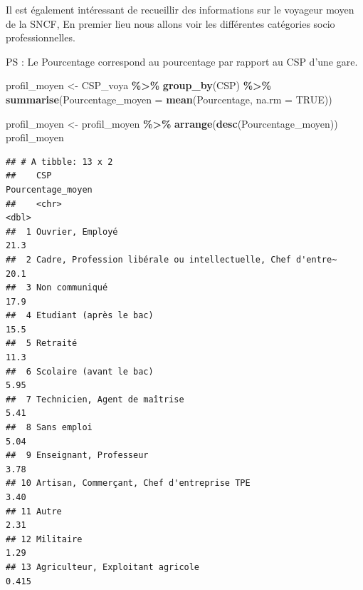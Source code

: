 \documentclass[
]{article}
\newenvironment{Shaded}{\begin{snugshade}}{\end{snugshade}}
\newcommand{\AttributeTok}[1]{\textcolor[rgb]{0.13,0.29,0.53}{#1}}
\newcommand{\ConstantTok}[1]{\textcolor[rgb]{0.56,0.35,0.01}{#1}}
\newcommand{\FunctionTok}[1]{\textcolor[rgb]{0.13,0.29,0.53}{\textbf{#1}}}
\newcommand{\NormalTok}[1]{#1}
\newcommand{\OtherTok}[1]{\textcolor[rgb]{0.56,0.35,0.01}{#1}}
\newcommand{\SpecialCharTok}[1]{\textcolor[rgb]{0.81,0.36,0.00}{\textbf{#1}}}
\begin{document}
Il est également intéressant de recueillir des informations sur le
voyageur moyen de la SNCF, En premier lieu nous allons voir les
différentes catégories socio professionnelles.

PS : Le Pourcentage correspond au pourcentage par rapport au CSP d'une
gare.

\begin{Shaded}
\begin{Highlighting}[]
\NormalTok{profil\_moyen }\OtherTok{\textless{}{-}}\NormalTok{ CSP\_voya }\SpecialCharTok{\%\textgreater{}\%}
  \FunctionTok{group\_by}\NormalTok{(CSP) }\SpecialCharTok{\%\textgreater{}\%}
  \FunctionTok{summarise}\NormalTok{(}\AttributeTok{Pourcentage\_moyen =} \FunctionTok{mean}\NormalTok{(Pourcentage, }\AttributeTok{na.rm =} \ConstantTok{TRUE}\NormalTok{))}

\NormalTok{profil\_moyen }\OtherTok{\textless{}{-}}\NormalTok{ profil\_moyen }\SpecialCharTok{\%\textgreater{}\%}
  \FunctionTok{arrange}\NormalTok{(}\FunctionTok{desc}\NormalTok{(Pourcentage\_moyen))}
\NormalTok{profil\_moyen}
\end{Highlighting}
\end{Shaded}

\begin{verbatim}
## # A tibble: 13 x 2
##    CSP                                                         Pourcentage_moyen
##    <chr>                                                                   <dbl>
##  1 Ouvrier, Employé                                                       21.3  
##  2 Cadre, Profession libérale ou intellectuelle, Chef d'entre~            20.1  
##  3 Non communiqué                                                         17.9  
##  4 Etudiant (après le bac)                                                15.5  
##  5 Retraité                                                               11.3  
##  6 Scolaire (avant le bac)                                                 5.95 
##  7 Technicien, Agent de maîtrise                                           5.41 
##  8 Sans emploi                                                             5.04 
##  9 Enseignant, Professeur                                                  3.78 
## 10 Artisan, Commerçant, Chef d'entreprise TPE                              3.40 
## 11 Autre                                                                   2.31 
## 12 Militaire                                                               1.29 
## 13 Agriculteur, Exploitant agricole                                        0.415
\end{verbatim}
\end{document}
